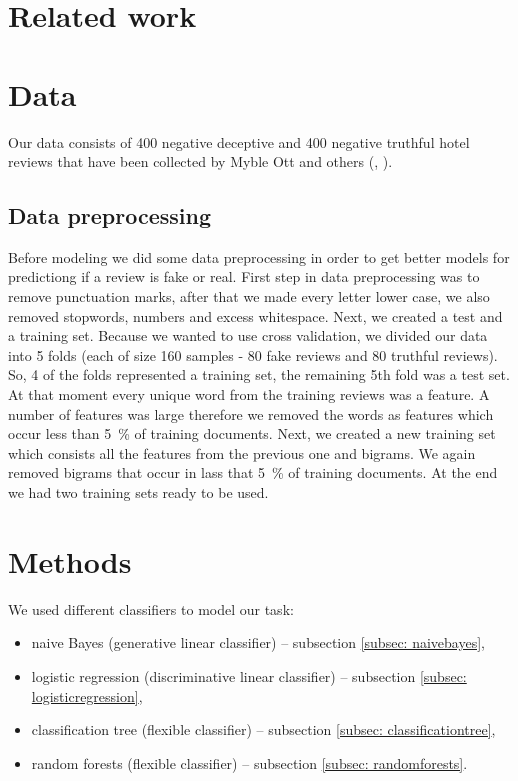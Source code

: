 \documentclass[a4paper,11pt]{article}
\begin{document}
\section{Related work}
\label{sec: relatedwork}

\section{Data}
\label{sec: data}
Our data consists of 400 negative deceptive and 400 negative truthful hotel reviews that have been collected by Myble Ott and others (\cite{article2}, \cite{article1}). 

\subsection{Data preprocessing}
Before modeling we did some data preprocessing in order to get better models for predictiong if a review is fake or real. First step in data preprocessing was to remove punctuation marks, after that we made every letter lower case, we also removed stopwords, numbers and excess whitespace. Next, we created a test and a training set. Because we wanted to use cross validation, we divided our data into 5 folds (each of size 160 samples - 80 fake reviews and 80 truthful reviews). So, 4 of the folds represented a training set, the remaining 5th fold was a test set. At that moment every unique word from the training reviews was a feature.  A number of features was large %
therefore we removed the words as features which occur less than 5~\% of training documents. Next, we created a new training set which consists all the features from the previous one and bigrams. We again removed bigrams that occur in lass that  5~\% of training documents. At the end we had two training sets ready to be used. 

\section{Methods}
\label{sec: methods}

We used different classifiers to model our task:
\begin{itemize}
	\item naive Bayes (generative linear classifier) -- subsection \ref{subsec: naivebayes},
	\item logistic regression (discriminative linear classifier) -- subsection \ref{subsec: logisticregression},
	\item classification tree (flexible classifier) -- subsection \ref{subsec: classificationtree},
	\item random forests (flexible classifier) -- subsection \ref{subsec: randomforests}.
\end{itemize}
\end{document}
